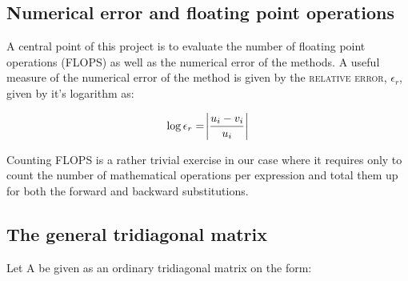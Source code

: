 \documentclass[12pt]{article}
\begin{document}
\begin{equation*}
\end{equation*}

\subsection{Numerical error and floating point operations}

A central point of this project is to evaluate the number of floating point operations (FLOPS) as well as the numerical error of the methods. A useful measure of the numerical error of the method is given by the \textsc{relative error}, $\epsilon_r$, given by it's logarithm as:

\begin{equation}\label{eq:eps}
\log{\epsilon_r} = \abs{\frac{u_i - v_i}{u_i}}
\end{equation}

\noindent Counting FLOPS is a rather trivial exercise in our case where it requires only to count the number of mathematical operations per expression and total them up for both the forward and backward substitutions. 
\subsection{The general tridiagonal matrix}

Let A be  given as an ordinary tridiagonal matrix on the form: 
\end{document}
